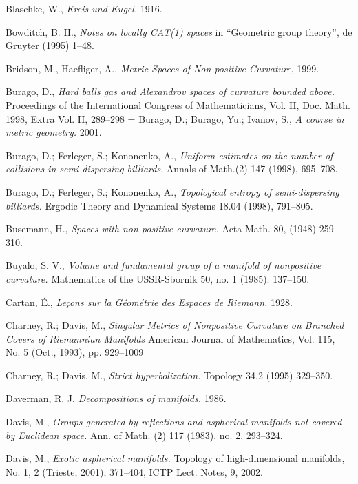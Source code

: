\begin{thebibliography}{52}
Blaschke, W., 
\textit{Kreis und Kugel.} 1916.

Bowditch, B. H.,
\textit{Notes on locally CAT(1) spaces} 
in ``Geometric group theory'', 
de Gruyter (1995) 1--48.

Bridson, M., 
Haefliger, A.,
\textit{Metric Spaces of Non-positive Curvature}, 1999.

Burago, D., 
\textit{Hard balls gas and Alexandrov spaces of curvature bounded above.} 
Proceedings of the International Congress of Mathematicians, Vol. II, 
Doc. Math. 1998, 
Extra Vol. II, 
289--298
= 
Burago, D.; 
Burago, Yu.; 
Ivanov, S., 
\textit{A course in metric geometry.} 2001. 

Burago, D.; 
Ferleger, S.; 
Kononenko, A.,
\textit{Uniform estimates on the number of collisions in semi-dispersing billiards},
Annals of Math.(2) 147 (1998), 695--708.

Burago, D.; 
Ferleger, S.;
Kononenko, A., 
\textit{Topological entropy of semi-dispersing billiards.} 
Ergodic Theory and Dynamical Systems 
18.04 
(1998), 
791--805.

Busemann, H., 
\textit{Spaces with non-positive curvature.} 
Acta Math. 
80, 
(1948) 
259--310.

Buyalo, S. V.,
\textit{Volume and fundamental group of a manifold of nonpositive curvature.}
Mathematics of the USSR-Sbornik 50, no. 1 (1985): 137--150.

Cartan, \'E.,
\textit{Le\c{c}ons sur la G\'eom\'etrie des Espaces de Riemann.} 1928.

Charney, R.;
Davis, M.,
\textit{Singular Metrics of Nonpositive Curvature on Branched Covers of Riemannian Manifolds}
American Journal of Mathematics, 
Vol. 115, 
No. 5 
(Oct., 1993), 
pp. 929--1009

Charney, R.; Davis, M., 
\textit{Strict hyperbolization.} 
Topology 
34.2 
(1995) 
329--350.

Daverman, R. J.
\textit{Decompositions of manifolds.} 1986.

Davis, M., 
\textit{Groups generated by reflections and aspherical manifolds not covered by Euclidean space.}
Ann. of Math. 
(2) 117 
(1983), 
no. 2, 
293--324. 

Davis, M.,
\textit{Exotic aspherical manifolds.} 
Topology of high-dimensional manifolds, 
No. 1, 2 (Trieste, 2001), 371--404, ICTP Lect. Notes, 9, 2002.




\end{thebibliography}
